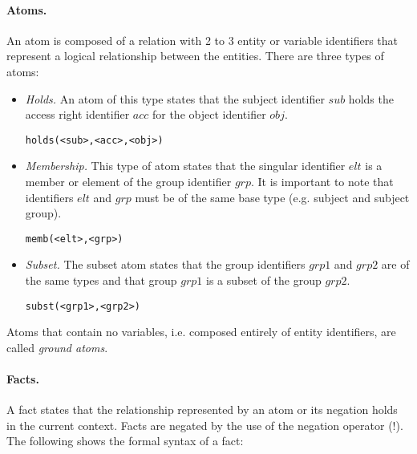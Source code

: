 \documentclass[global,twocolumn,draft]{svjour}
\newenvironment{vverbatim}
  {\begin{alltt}}
  {\vspace{-\baselineskip}\end{alltt}}
\begin{document}
        \paragraph{Atoms.}
          An atom is composed of a relation with 2 to 3 entity or variable
          identifiers that represent a logical relationship between the
          entities. There are three types of atoms:

          \begin{itemize}
            \item
              {\em Holds.} An atom of this type states that the subject
              identifier $sub$ holds the access right identifier $acc$
              for the object identifier $obj$.

              \begin{vverbatim}
  holds(<sub>, <acc>, <obj>)
              \end{vverbatim}
            \item
              {\em Membership.} This type of atom states that the singular
              identifier $elt$ is a member or element of the group identifier
              $grp$. It is important to note that identifiers $elt$ and $grp$
              must be of the same base type (e.g. subject and subject group).

              \begin{vverbatim}
  memb(<elt>, <grp>)
              \end{vverbatim}
            \item
              {\em Subset.} The subset atom states that the group identifiers
              $grp1$ and $grp2$ are of the same types and that group $grp1$ is
              a subset of the group $grp2$.

              \begin{vverbatim}
  subst(<grp1>, <grp2>)
              \end{vverbatim}
          \end{itemize}

          Atoms that contain no variables, i.e. composed entirely of entity
          identifiers, are called {\em ground atoms}.

        \paragraph{Facts.}
          A fact states that the relationship represented by an atom or
          its negation holds in the current context. Facts are negated by the
          use of the negation operator ($!$). The following shows the formal
          syntax of a fact:
\end{document}
